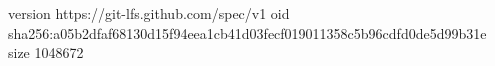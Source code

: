 version https://git-lfs.github.com/spec/v1
oid sha256:a05b2dfaf68130d15f94eea1cb41d03fecf019011358c5b96cdfd0de5d99b31e
size 1048672
